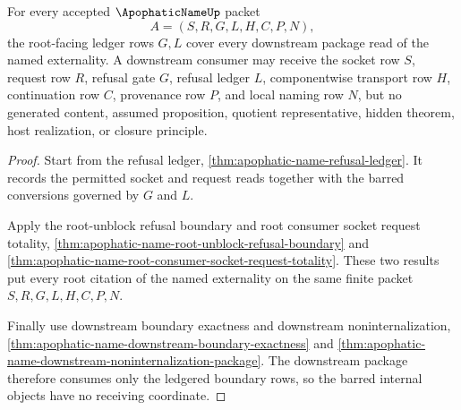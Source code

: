 \begin{theorem}
\label{thm:apophatic-name-root-ledger-coverage}
For every accepted $\ApophaticNameUp$ packet
$$
A=(S,R,G,L,H,C,P,N),
$$
the root-facing ledger rows $G,L$ cover every downstream package read of the named externality. A downstream consumer may receive the socket row $S$, request row $R$, refusal gate $G$, refusal ledger $L$, componentwise transport row $H$, continuation row $C$, provenance row $P$, and local naming row $N$, but no generated content, assumed proposition, quotient representative, hidden theorem, host realization, or closure principle.
\end{theorem}
\begin{proof}
Start from the refusal ledger, \autoref{thm:apophatic-name-refusal-ledger}. It records the permitted socket and request reads together with the barred conversions governed by $G$ and $L$.

Apply the root-unblock refusal boundary and root consumer socket request totality, \autoref{thm:apophatic-name-root-unblock-refusal-boundary} and \autoref{thm:apophatic-name-root-consumer-socket-request-totality}. These two results put every root citation of the named externality on the same finite packet $S,R,G,L,H,C,P,N$.

Finally use downstream boundary exactness and downstream noninternalization, \autoref{thm:apophatic-name-downstream-boundary-exactness} and \autoref{thm:apophatic-name-downstream-noninternalization-package}. The downstream package therefore consumes only the ledgered boundary rows, so the barred internal objects have no receiving coordinate.
\end{proof}


